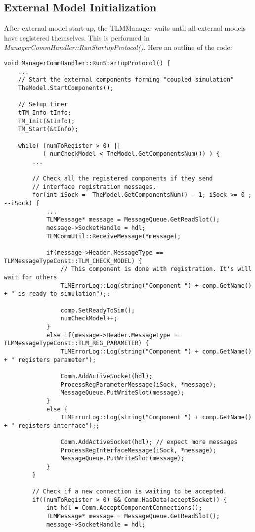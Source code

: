 \subsection{External Model Initialization}
After external model start-up, the TLMManager waits until all external models have registered themselves. 
This is performed in {\em ManagerCommHandler::RunStartupProtocol()}. 
Here an outline of the code:
{\scriptsize
\begin{verbatim}
void ManagerCommHandler::RunStartupProtocol() {
    ...
    // Start the external components forming "coupled simulation"
    TheModel.StartComponents();

    // Setup timer
    tTM_Info tInfo;
    TM_Init(&tInfo);
    TM_Start(&tInfo);

    while( (numToRegister > 0) ||
           ( numCheckModel < TheModel.GetComponentsNum()) ) {
        ...

        // Check all the registered components if they send
        // interface registration messages.
        for(int iSock =  TheModel.GetComponentsNum() - 1; iSock >= 0 ; --iSock) {
            ...
            TLMMessage* message = MessageQueue.GetReadSlot();
            message->SocketHandle = hdl;
            TLMCommUtil::ReceiveMessage(*message);

            if(message->Header.MessageType == TLMMessageTypeConst::TLM_CHECK_MODEL) {
                // This component is done with registration. It's will wait for others
                TLMErrorLog::Log(string("Component ") + comp.GetName() + " is ready to simulation");;

                comp.SetReadyToSim();
                numCheckModel++;
            }
            else if(message->Header.MessageType == TLMMessageTypeConst::TLM_REG_PARAMETER) {
                TLMErrorLog::Log(string("Component ") + comp.GetName() + " registers parameter");
                      
                Comm.AddActiveSocket(hdl);
                ProcessRegParameterMessage(iSock, *message);
                MessageQueue.PutWriteSlot(message);
            }
            else {
                TLMErrorLog::Log(string("Component ") + comp.GetName() + " registers interface");;

                Comm.AddActiveSocket(hdl); // expect more messages
                ProcessRegInterfaceMessage(iSock, *message);
                MessageQueue.PutWriteSlot(message);
            }
        }

        // Check if a new connection is waiting to be accepted.
        if((numToRegister > 0) && Comm.HasData(acceptSocket)) {
            int hdl = Comm.AcceptComponentConnections();
            TLMMessage* message = MessageQueue.GetReadSlot();
            message->SocketHandle = hdl;


\end{verbatim}}
